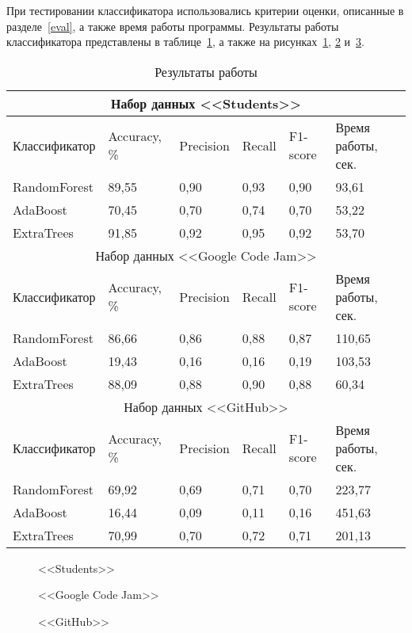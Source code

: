 При тестировании классификатора использовались критерии оценки, описанные в разделе~\ref{eval}, 
а также время работы программы. Результаты работы классификатора представлены в таблице~\ref{tab:results}, а также
на рисунках~\ref{students_res:students_res}, \ref{google:google} и~\ref{github:github}.

\begin{table}[h!]
\caption{ Результаты работы }
\label{tab:results}
\begin{center}
\begin{tabularx}{\linewidth}{|X|X|X|X|X|X|}
\hline
\multicolumn{6}{|c|}{Набор данных <<Students>>} \\
\hline
Классификатор & Accuracy, \% & Precision & Recall & F1-score & Время работы, сек.\\
\hline
RandomForest & 89,55 & 0,90 & 0,93 & 0,90 & 93,61\\
\hline
AdaBoost & 70,45 & 0,70 & 0,74 & 0,70 & 53,22\\
\hline
ExtraTrees & 91,85 & 0,92 & 0,95 & 0,92 & 53,70 \\
\hline
\multicolumn{6}{|c|}{Набор данных <<Google Code Jam>>} \\
\hline
Классификатор & Accuracy, \% & Precision & Recall & F1-score & Время работы, сек.\\
\hline
RandomForest & 86,66 & 0,86 & 0,88 & 0,87 & 110,65\\
\hline
AdaBoost & 19,43 & 0,16 & 0,16 & 0,19 & 103,53\\
\hline
ExtraTrees & 88,09 & 0,88 & 0,90 & 0,88 & 60,34 \\
\hline
\multicolumn{6}{|c|}{Набор данных <<GitHub>>} \\
\hline
Классификатор & Accuracy, \% & Precision & Recall & F1-score & Время работы, сек.\\
\hline
RandomForest & 69,92 & 0,69 & 0,71 & 0,70 & 223,77\\
\hline
AdaBoost & 16,44 & 0,09 & 0,11 & 0,16 & 451,63\\
\hline
ExtraTrees & 70,99 & 0,70 & 0,72 & 0,71 & 201,13 \\
\hline
\end{tabularx}
\end{center}
\end{table}

\begin{figure}[h!]
\caption{ <<Students>> }
\label{students_res:students_res}
\end{figure}

\begin{figure}[h!]
\caption{ <<Google Code Jam>> }
\label{google:google}
\end{figure}

\begin{figure}[h!]
\caption{ <<GitHub>> }
\label{github:github}
\end{figure}

\clearpage
